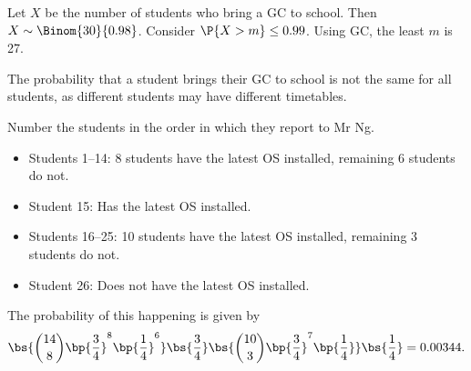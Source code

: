 \begin{solution}
    \begin{ppart}
        \begin{psubpart}
            Let $X$ be the number of students who bring a GC to school. Then $X \sim \Binom{30}{0.98}$. Consider $\P{X > m} \leq 0.99$. Using GC, the least $m$ is 27.
        \end{psubpart}
        \begin{psubpart}
            The probability that a student brings their GC to school is not the same for all students, as different students may have different timetables.
        \end{psubpart}
    \end{ppart}
    \begin{ppart}
        Number the students in the order in which they report to Mr Ng.
        \begin{itemize}
            \item Students 1--14: 8 students have the latest OS installed, remaining 6 students do not.
            \item Student 15: Has the latest OS installed.
            \item Students 16--25: 10 students have the latest OS installed, remaining 3 students do not.
            \item Student 26: Does not have the latest OS installed.
        \end{itemize}
        The probability of this happening is given by \[\bs{\binom{14}{8} \bp{\frac34}^8 \bp{\frac14}^6} \bs{\frac34} \bs{\binom{10}{3} \bp{\frac34}^7 \bp{\frac14}} \bs{\frac14} = 0.00344.\]
    \end{ppart}
\end{solution}

